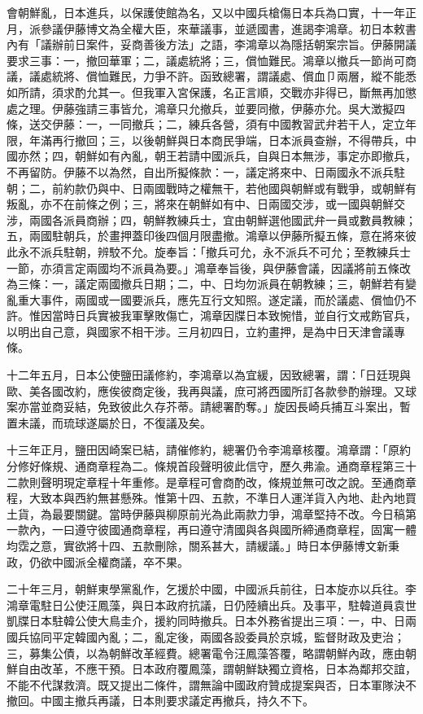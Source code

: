 \begin{pinyinscope}
會朝鮮亂，日本進兵，以保護使館為名，又以中國兵槍傷日本兵為口實，十一年正月，派參議伊藤博文為全權大臣，來華議事，並遞國書，進謁李鴻章。初日本敕書內有「議辦前日案件，妥商善後方法」之語，李鴻章以為隱括朝案宗旨。伊藤開議要求三事：一，撤回華軍；二，議處統將；三，償恤難民。鴻章以撤兵一節尚可商議，議處統將、償恤難民，力爭不許。函致總署，謂議處、償血⼙兩層，縱不能悉如所請，須求酌允其一。但我軍入宮保護，名正言順，交戰亦非得已，斷無再加懲處之理。伊藤強請三事皆允，鴻章只允撤兵，並要同撤，伊藤亦允。吳大澂擬四條，送交伊藤：一，一同撤兵；二，練兵各營，須有中國教習武弁若干人，定立年限，年滿再行撤回；三，以後朝鮮與日本商民爭端，日本派員查辦，不得帶兵，中國亦然；四，朝鮮如有內亂，朝王若請中國派兵，自與日本無涉，事定亦即撤兵，不再留防。伊藤不以為然，自出所擬條款：一，議定將來中、日兩國永不派兵駐朝；二，前約款仍與中、日兩國戰時之權無干，若他國與朝鮮或有戰爭，或朝鮮有叛亂，亦不在前條之例；三，將來在朝鮮如有中、日兩國交涉，或一國與朝鮮交涉，兩國各派員商辦；四，朝鮮教練兵士，宜由朝鮮選他國武弁一員或數員教練；五，兩國駐朝兵，於畫押蓋印後四個月限盡撤。鴻章以伊藤所擬五條，意在將來彼此永不派兵駐朝，辨駮不允。旋奉旨：「撤兵可允，永不派兵不可允；至教練兵士一節，亦須言定兩國均不派員為要。」鴻章奉旨後，與伊藤會議，因議將前五條改為三條：一，議定兩國撤兵日期；二，中、日均勿派員在朝教練；三，朝鮮若有變亂重大事件，兩國或一國要派兵，應先互行文知照。遂定議，而於議處、償恤仍不許。惟因當時日兵實被我軍擊敗傷亡，鴻章因牒日本致惋惜，並自行文戒飭官兵，以明出自己意，與國家不相干涉。三月初四日，立約畫押，是為中日天津會議專條。

十二年五月，日本公使鹽田議修約，李鴻章以為宜緩，因致總署，謂：「日廷現與歐、美各國改約，應俟彼商定後，我再與議，庶可將西國所訂各款參酌辦理。又球案亦當並商妥結，免致彼此久存芥蒂。請總署酌奪。」旋因長崎兵捕互斗案出，暫置未議，而琉球遂屬於日，不復議及矣。

十三年正月，鹽田因崎案已結，請催修約，總署仍令李鴻章核覆。鴻章謂：「原約分修好條規、通商章程為二。條規首段聲明彼此信守，歷久弗渝。通商章程第三十二款則聲明現定章程十年重修。是章程可會商酌改，條規並無可改之說。至通商章程，大致本與西約無甚懸殊。惟第十四、五款，不準日人運洋貨入內地、赴內地買土貨，為最要關鍵。當時伊藤與柳原前光為此兩款力爭，鴻章堅持不改。今日稿第一款內，一曰遵守彼國通商章程，再曰遵守清國與各與國所締通商章程，固寓一體均霑之意，實欲將十四、五款刪除，關系甚大，請緩議。」時日本伊藤博文新秉政，仍欲中國派全權商議，卒不果。

二十年三月，朝鮮東學黨亂作，乞援於中國，中國派兵前往，日本旋亦以兵往。李鴻章電駐日公使汪鳳藻，與日本政府抗議，日仍陸續出兵。及事平，駐韓道員袁世凱牒日本駐韓公使大鳥圭介，援約同時撤兵。日本外務省提出三項：一，中、日兩國兵協同平定韓國內亂；二，亂定後，兩國各設委員於京城，監督財政及吏治；三，募集公債，以為朝鮮改革經費。總署電令汪鳳藻答覆，略謂朝鮮內政，應由朝鮮自由改革，不應干預。日本政府覆鳳藻，謂朝鮮缺獨立資格，日本為鄰邦交誼，不能不代謀救濟。既又提出二條件，謂無論中國政府贊成提案與否，日本軍隊決不撤回。中國主撤兵再議，日本則要求議定再撤兵，持久不下。


\end{pinyinscope}
